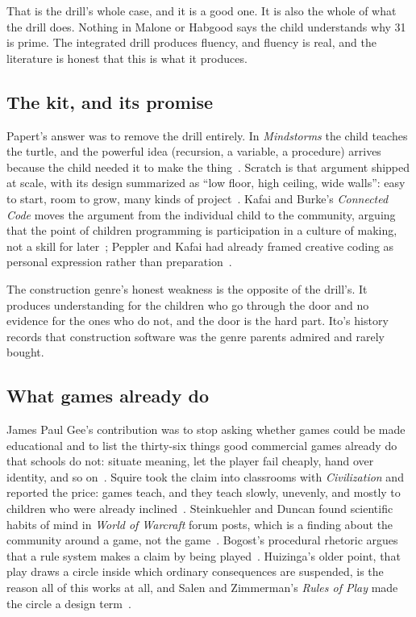 \documentclass[10pt,letterpaper,twocolumn]{article}
\newcommand{\term}[1]{``#1''}
\begin{document}
That is the drill's whole case, and it is a good one. It is also the whole of what the drill does. Nothing in Malone or Habgood says the child understands why 31 is prime. The integrated drill produces fluency, and fluency is real, and the literature is honest that this is what it produces.

\subsection{The kit, and its promise}

Papert's answer was to remove the drill entirely. In \emph{Mindstorms} the child teaches the turtle, and the powerful idea (recursion, a variable, a procedure) arrives because the child needed it to make the thing~\citep{papert1980mindstorms}. Scratch is that argument shipped at scale, with its design summarized as \term{low floor, high ceiling, wide walls}: easy to start, room to grow, many kinds of project~\citep{resnick2009scratch}. Kafai and Burke's \emph{Connected Code} moves the argument from the individual child to the community, arguing that the point of children programming is participation in a culture of making, not a skill for later~\citep{kafai2014connected}; Peppler and Kafai had already framed creative coding as personal expression rather than preparation~\citep{peppler2009creative}.

The construction genre's honest weakness is the opposite of the drill's. It produces understanding for the children who go through the door and no evidence for the ones who do not, and the door is the hard part. Ito's history records that construction software was the genre parents admired and rarely bought.

\subsection{What games already do}

James Paul Gee's contribution was to stop asking whether games could be made educational and to list the thirty-six things good commercial games already do that schools do not: situate meaning, let the player fail cheaply, hand over identity, and so on~\citep{gee2003video}. Squire took the claim into classrooms with \emph{Civilization} and reported the price: games teach, and they teach slowly, unevenly, and mostly to children who were already inclined~\citep{squire2011video}. Steinkuehler and Duncan found scientific habits of mind in \emph{World of Warcraft} forum posts, which is a finding about the community around a game, not the game~\citep{steinkuehler2008scientific}. Bogost's procedural rhetoric argues that a rule system makes a claim by being played~\citep{bogost2007persuasive}. Huizinga's older point, that play draws a circle inside which ordinary consequences are suspended, is the reason all of this works at all, and Salen and Zimmerman's \emph{Rules of Play} made the circle a design term~\citep{huizinga1938homo,salen2004rules}.
\end{document}
